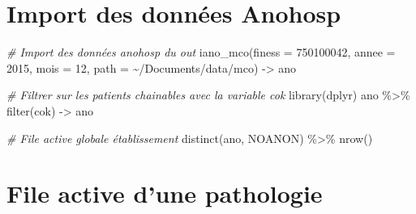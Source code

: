 \documentclass[
]{book}
\newenvironment{Shaded}{\begin{snugshade}}{\end{snugshade}}
\newcommand{\AttributeTok}[1]{\textcolor[rgb]{0.77,0.63,0.00}{#1}}
\newcommand{\CommentTok}[1]{\textcolor[rgb]{0.56,0.35,0.01}{\textit{#1}}}
\newcommand{\DecValTok}[1]{\textcolor[rgb]{0.00,0.00,0.81}{#1}}
\newcommand{\FunctionTok}[1]{\textcolor[rgb]{0.00,0.00,0.00}{#1}}
\newcommand{\NormalTok}[1]{#1}
\newcommand{\OtherTok}[1]{\textcolor[rgb]{0.56,0.35,0.01}{#1}}
\newcommand{\SpecialCharTok}[1]{\textcolor[rgb]{0.00,0.00,0.00}{#1}}
\newcommand{\StringTok}[1]{\textcolor[rgb]{0.31,0.60,0.02}{#1}}
\begin{document}
\hypertarget{import-des-donnuxe9es-anohosp}{%
\section{Import des données Anohosp}\label{import-des-donnuxe9es-anohosp}}

\begin{Shaded}
\begin{Highlighting}[]
\CommentTok{\# Import des données anohosp du out}
\FunctionTok{iano\_mco}\NormalTok{(}\AttributeTok{finess =} \DecValTok{750100042}\NormalTok{, }
         \AttributeTok{annee =} \DecValTok{2015}\NormalTok{,}
         \AttributeTok{mois =} \DecValTok{12}\NormalTok{,}
         \AttributeTok{path =} \StringTok{\textquotesingle{}\textasciitilde{}/Documents/data/mco\textquotesingle{}}\NormalTok{) }\OtherTok{{-}\textgreater{}}\NormalTok{ ano}

\CommentTok{\# Filtrer sur les patients chainables avec la variable cok}
\FunctionTok{library}\NormalTok{(dplyr)}
\NormalTok{ano }\SpecialCharTok{\%\textgreater{}\%} \FunctionTok{filter}\NormalTok{(cok) }\OtherTok{{-}\textgreater{}}\NormalTok{ ano}

\CommentTok{\# File active globale établissement}
\FunctionTok{distinct}\NormalTok{(ano, NOANON) }\SpecialCharTok{\%\textgreater{}\%} \FunctionTok{nrow}\NormalTok{()}
\end{Highlighting}
\end{Shaded}

\hypertarget{file-active-dune-pathologie}{%
\section{File active d'une pathologie}\label{file-active-dune-pathologie}}

\begin{Shaded}
\end{Shaded}
\end{document}
